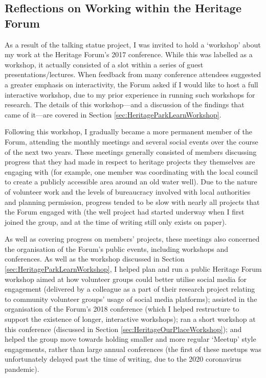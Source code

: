 \subsection{Reflections on Working within the Heritage Forum}
As a result of the talking statue project, I was invited to hold a `workshop' about my work at the Heritage Forum's 2017 conference. While this was labelled as a workshop, it actually consisted of a slot within a series of guest presentations/lectures. When feedback from many conference attendees suggested a greater emphasis on interactivity, the Forum asked if I would like to host a full interactive workshop, due to my prior experience in running such workshops for research. The details of this workshop---and a discussion of the findings that came of it---are covered in Section \ref{sec:HeritageParkLearnWorkshop}.

Following this workshop, I gradually became a more permanent member of the Forum, attending the monthly meetings and several social events over the course of the next two years. These meetings generally consisted of members discussing progress that they had made in respect to heritage projects they themselves are engaging with (for example, one member was coordinating with the local council to create a publicly accessible area around an old water well). Due to the nature of volunteer work and the levels of bureaucracy involved with local authorities and planning permission, progress tended to be slow with nearly all projects that the Forum engaged with (the well project had started underway when I first joined the group, and at the time of writing still only exists on paper). 

As well as covering progress on members' projects, these meetings also concerned the organisation of the Forum's public events, including workshops and conferences. As well as the workshop discussed in Section \ref{sec:HeritageParkLearnWorkshop}, I helped plan and run a public Heritage Forum workshop aimed at how volunteer groups could better utilise social media for engagement (delivered by a colleague as a part of their research project relating to community volunteer groups' usage of social media platforms); assisted in the organisation of the Forum's 2018 conference (which I helped restructure to support the existence of longer, interactive workshops); ran a short workshop at this conference (discussed in Section \ref{sec:HeritageOurPlaceWorkshop}); and helped the group move towards holding smaller and more regular `Meetup' style engagements, rather than large annual conferences (the first of these meetups was unfortunately delayed past the time of writing, due to the 2020 coronavirus pandemic).

